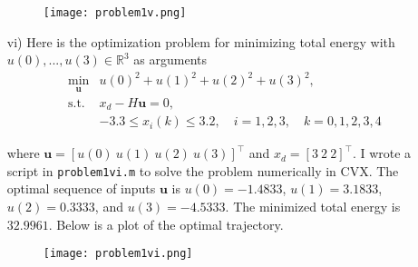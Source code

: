 \begin{homeworkProblem}
\begin{solution}
\begin{itemize}
                \begin{figure}[h!]
                    \centering
                    \texttt{[image: problem1v.png]}
                \end{figure}

            \pagebreak

            \item[vi)] Here is the optimization problem for minimizing total 
                energy with $u(0),..., u(3) \in \mathbb{R}^3$ as arguments
                \[
                    \begin{array}{rl}
                        \min\limits_{\boldsymbol{u}} & u(0)^2 + u(1)^2 + u(2)^2 + u(3)^2, \\ [2ex]
                        \text{s.t.} & x_d - H \boldsymbol{u} = 0, \\ [1ex]
                        & -3.3 \leq x_i(k) \leq 3.2, \quad i=1,2,3, \quad k=0,1,2,3,4
                    \end{array}
                \]

                where $\boldsymbol{u} = [u(0) \ u(1) \ u(2) \ u(3)]^\top$ and
                $x_d = [3 \ 2 \ 2]^\top$. I wrote a script in \texttt{problem1vi.m}
                to solve the problem numerically in CVX. The optimal sequence 
                of inputs $\boldsymbol{u}$ is $u(0) = -1.4833$, $u(1) = 
                3.1833$, $u(2) = 0.3333$, and $u(3) = -4.5333$. The minimized 
                total energy is $32.9961$. Below is a plot of the 
                optimal trajectory.

                \begin{figure}[h!]
                    \centering
                    \texttt{[image: problem1vi.png]}
                \end{figure}

        \end{itemize}

    \end{solution}

\end{homeworkProblem}